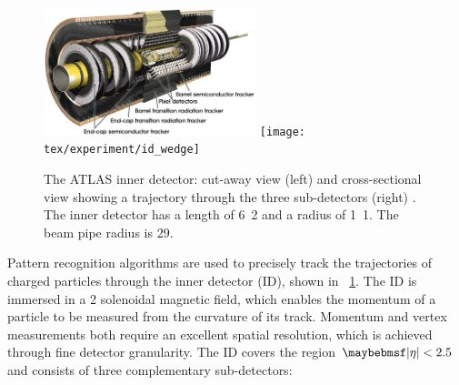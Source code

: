 \begin{figure}[t]
	\includegraphics[width=0.55\textwidth]{tex/experiment/id_whole}
	\hfill
	\texttt{[image: tex/experiment/id\_wedge]}
	\caption{The ATLAS inner detector: cut-away view (left) and cross-sectional view 
	showing a trajectory through the three sub-detectors (right) \cite{ATLAS-detector}. 
	The inner detector has a length of \unit{6.2}{\metre} and a radius of 
	\unit{1.1}{\metre}. The beam pipe radius is \unit{29}{\milli\metre}.}
	\label{fig:inner_detector}
\end{figure}

Pattern recognition algorithms are used to precisely track the trajectories of charged 
particles through the inner detector (ID), shown in \Figure~\ref{fig:inner_detector}. The 
ID is immersed in a \unit{2}{\tesla} solenoidal magnetic field, which enables the 
momentum of a particle to be measured from the curvature of its track. Momentum and 
vertex measurements both require an excellent spatial resolution, which is achieved 
through fine detector granularity. The ID covers the region $\mods{\eta} < 2.5$ and 
consists of three complementary sub-detectors:

